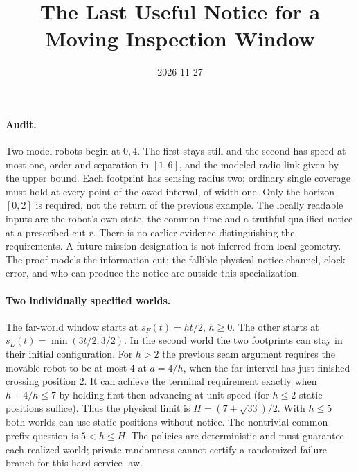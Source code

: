 \documentclass[11pt]{article}
\title{The Last Useful Notice for a Moving Inspection Window}
\date{2026-11-27}
\begin{document}
\maketitle

\paragraph{Audit.}
Two model robots begin at \(0,4\). The first stays still and the second
has speed at most one, order and separation in \([1,6]\), and the
modeled radio link given by the upper bound. Each footprint has sensing
radius two; ordinary single coverage must hold at every point of the
owed interval, of width one. Only the horizon \([0,2]\) is required,
not the return of the previous example. The locally readable inputs
are the robot's own state, the common time and a truthful qualified
notice at a prescribed cut \(r\). There is no earlier evidence
distinguishing the requirements. A future mission designation is
not inferred from local geometry. The proof models the information
cut; the fallible physical notice channel, clock error, and who can
produce the notice are outside this specialization.

\paragraph{Two individually specified worlds.}
The far-world window starts at \(s_F(t)=h t/2\), \(h\ge0\). The other
starts at \(s_L(t)=\min(3t/2,3/2)\). In the second world the two
footprints can stay in their initial configuration. For \(h>2\)
the previous seam argument requires the movable robot to be at
most \(4\) at \(a=4/h\), when the far interval has just finished
crossing position \(2\). It can achieve the terminal requirement
exactly when \(h+4/h\le7\) by holding first then advancing at unit
speed (for \(h\le2\) static positions suffice). Thus the physical
limit is \(H=(7+\sqrt{33})/2\). With \(h\le5\) both worlds can use
static positions without notice. The nontrivial common-prefix
question is \(5<h\le H\). The policies are deterministic and
must guarantee each realized world; private randomness cannot
certify a randomized failure branch for this hard service law.
\end{document}
